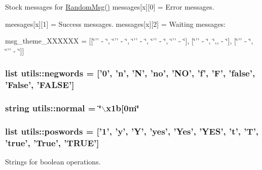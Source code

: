 \-Stock messages for \hyperlink{namespaceutils_a17b230eb88f99a55015827768f6d5c6e}{\-Random\-Msg()} messages\mbox{[}x\mbox{]}\mbox{[}0\mbox{]} = \-Error messages. 

meesages\mbox{[}x\mbox{]}\mbox{[}1\mbox{]} = \-Success messages. messages\mbox{[}x\mbox{]}\mbox{[}2\mbox{]} = \-Waiting messages\-:

msg\-\_\-theme\-\_\-\-X\-X\-X\-X\-X\-X = \mbox{[}\mbox{[}\char`\"{}'' -\/ \char`\"{}, \char`\"{}'' -\/ \char`\"{}, \char`\"{}'' -\/ \char`\"{}, \char`\"{}'' -\/ \char`\"{}, \char`\"{}'' -\/ \char`\"{}\mbox{]}, \mbox{[}\char`\"{}'' -\/ \char`\"{}, \char`\"{},, -\/ \char`\"{}\mbox{]}, \mbox{[}\char`\"{}'' -\/ \char`\"{}, \char`\"{}'' -\/ \char`\"{}\mbox{]}\mbox{]} \hypertarget{namespaceutils_ac5349eff7e6e2f70d80d31ece6d91b0d}{
\subsubsection[{negwords}]{\setlength{\rightskip}{0pt plus 5cm}list {\bf utils\-::negwords} = \mbox{[}'0', 'n', '\-N', 'no', '\-N\-O', 'f', '\-F', 'false', '\-False', '\-F\-A\-L\-S\-E'\mbox{]}}}\label{namespaceutils_ac5349eff7e6e2f70d80d31ece6d91b0d}
\hypertarget{namespaceutils_ad1a7a4b15c6ecd7cb18acd3b6f7727a2}{
\subsubsection[{normal}]{\setlength{\rightskip}{0pt plus 5cm}string {\bf utils\-::normal} = \char`\"{}$\backslash$x1b\mbox{[}0m\char`\"{}}}\label{namespaceutils_ad1a7a4b15c6ecd7cb18acd3b6f7727a2}
\hypertarget{namespaceutils_a2b1e85a9f2279ea635c53853c81ce829}{
\subsubsection[{poswords}]{\setlength{\rightskip}{0pt plus 5cm}list {\bf utils\-::poswords} = \mbox{[}'1', 'y', '\-Y', 'yes', '\-Yes', '\-Y\-E\-S', 't', '\-T', 'true', '\-True', '\-T\-R\-U\-E'\mbox{]}}}\label{namespaceutils_a2b1e85a9f2279ea635c53853c81ce829}


\-Strings for boolean operations. 


